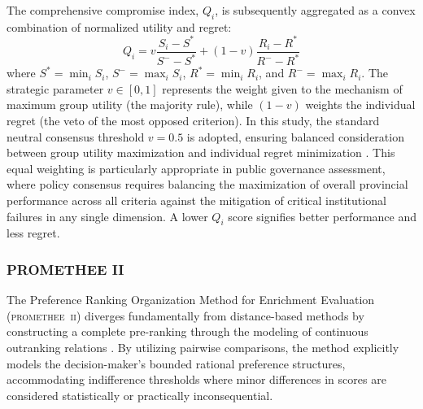 \documentclass[12pt,a4paper]{article}
\begin{document}
The comprehensive compromise index, \( Q_i \), is subsequently aggregated as a convex combination of normalized utility and regret:
\begin{equation}
    Q_i = v \frac{S_i - S^*}{S^- - S^*} + (1 - v) \frac{R_i - R^*}{R^- - R^*}
\end{equation}
where \( S^* = \min_i S_i \), \( S^- = \max_i S_i \), \( R^* = \min_i R_i \), and \( R^- = \max_i R_i \). The strategic parameter \( v \in [0, 1] \) represents the weight given to the mechanism of maximum group utility (the majority rule), while \( (1-v) \) weights the individual regret (the veto of the most opposed criterion). In this study, the standard neutral consensus threshold \( v = 0.5 \) is adopted, ensuring balanced consideration between group utility maximization and individual regret minimization \citep{Opricovic2004}. This equal weighting is particularly appropriate in public governance assessment, where policy consensus requires balancing the maximization of overall provincial performance across all criteria against the mitigation of critical institutional failures in any single dimension. A lower \( Q_i \) score signifies better performance and less regret.

\subsubsection{PROMETHEE II}
\label{subsubsec:promethee}
The Preference Ranking Organization Method for Enrichment Evaluation (\textsc{promethee~ii}) diverges fundamentally from distance-based methods by constructing a complete pre-ranking through the modeling of continuous outranking relations \citep{Brans1985}. By utilizing pairwise comparisons, the method explicitly models the decision-maker's bounded rational preference structures, accommodating indifference thresholds where minor differences in scores are considered statistically or practically inconsequential.
\end{document}

